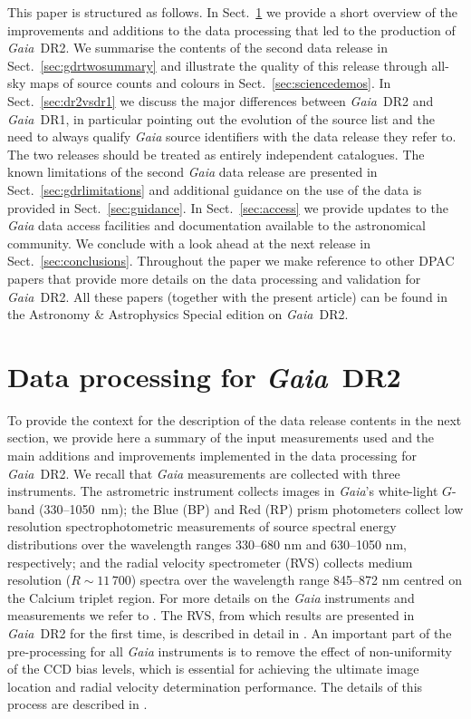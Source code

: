 \documentclass[longauth]{aa_gaia} %
\newcommand\gaia{\textit{Gaia}}
\newcommand\gdr[1]{\gaia~DR#1}
\newcommand\secref[1]{Sect.~\ref{#1}}
\begin{document}
This paper is structured as follows. In \secref{sec:dataprocessing} we provide a short overview of
the improvements and additions to the data processing that led to the production of \gdr{2}. We
summarise the contents of the second data release in \secref{sec:gdrtwosummary} and illustrate the
quality of this release through all-sky maps of source counts and colours in
\secref{sec:sciencedemos}.  In \secref{sec:dr2vsdr1} we discuss the major differences between
\gdr{2} and \gdr{1}, in particular pointing out the evolution of the source list and the need to
always qualify {\gaia} source identifiers with the data release they refer to. The two releases
should be treated as entirely independent catalogues. The known limitations of the second {\gaia}
data release are presented in \secref{sec:gdrlimitations} and additional guidance on the use of the
data is provided in \secref{sec:guidance}. In \secref{sec:access} we provide updates to the {\gaia}
data access facilities and documentation available to the astronomical community. We conclude with a
look ahead at the next release in \secref{sec:conclusions}. Throughout the paper we make reference
to other DPAC papers that provide more details on the data processing and validation for \gdr{2}.
All these papers (together with the present article) can be found in the Astronomy \& Astrophysics
Special edition on \gdr{2}.

%
%

\section{Data processing for \gdr{2}}
\label{sec:dataprocessing}

To provide the context for the description of the data release contents in the next section, we provide
here a summary of the input measurements used and the main additions and improvements implemented in
the data processing for \gdr{2}. We recall that {\gaia} measurements are collected with three
instruments. The astrometric instrument collects images in {\gaia}'s white-light $G$-band
(330--1050~nm); the Blue (BP) and Red (RP) prism photometers collect low resolution
spectrophotometric measurements of source spectral energy distributions over the wavelength ranges
330--680 nm and 630--1050 nm, respectively; and the radial velocity spectrometer (RVS) collects
medium resolution ($R\sim11\,700$) spectra over the wavelength range 845--872 nm centred on the
Calcium triplet region. For more details on the {\gaia} instruments and measurements we refer to
\cite{2016A&A...595A...1G}. The RVS, from which results are presented in \gdr{2} for the first
time, is described in detail in \cite{DR2-DPACP-46}. An important part of the pre-processing for all
{\gaia} instruments is to remove the effect of non-uniformity of the CCD bias levels, which is
essential for achieving the ultimate image location and radial velocity determination performance.
The details of this process are described in \cite{DR2-DPACP-29}.
\end{document}
